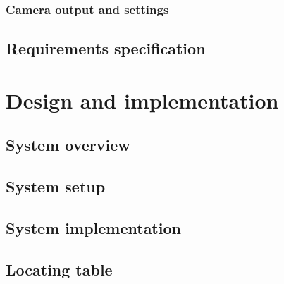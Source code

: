 %			
	
		\subsection{Camera output and settings}
			\label{sec:camera}
			
	
%			
	
					
	\section{Requirements specification}
		\label{sec:reqspec}
		

\chapter{Design and implementation}
	\label{solution}
	
	
	\section{System overview}
		\label{sec:sysdesign}
		

	\section{System setup}
		\label{sec:setup}
		
		
	\section{System implementation}
		\label{sec:implementation}
		
		
	\section{Locating table}
		\label{sec:table-locate}
			
		

